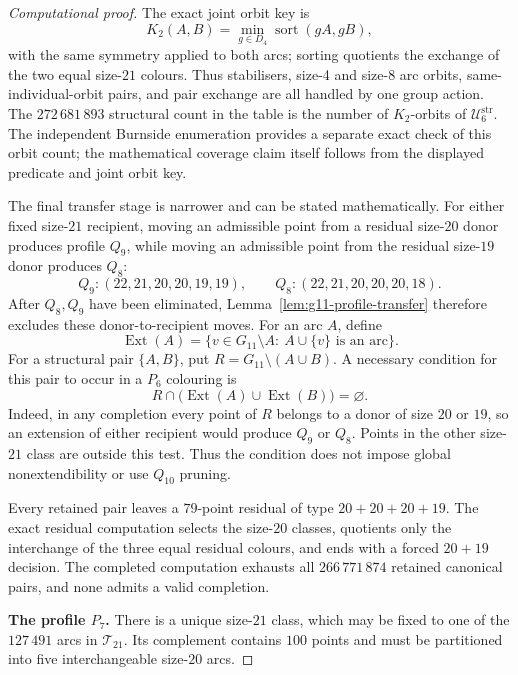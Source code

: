 \documentclass[11pt]{article}
\theoremstyle{definition}
\theoremstyle{remark}
\newcommand{\Dfour}{D_4}
\begin{document}
\begin{proof}[Computational proof]
The exact joint orbit key is
\[
 K_2(A,B)=\min_{g\in\Dfour}\operatorname{sort}(gA,gB),
\]
with the same symmetry applied to both arcs; sorting quotients the exchange of
the two equal size-\(21\) colours.  Thus stabilisers, size-4 and size-8 arc
orbits, same-individual-orbit pairs, and pair exchange are all handled by one
group action.  The \(272\,681\,893\) structural count in the table is the
number of \(K_2\)-orbits of \(\mathcal U^{\mathrm{str}}_6\).  The independent
Burnside enumeration provides a separate exact check of this orbit count; the
mathematical coverage claim itself follows from the displayed predicate and
joint orbit key.

The final transfer stage is narrower and can be stated mathematically.  For
either fixed size-\(21\) recipient, moving an admissible point from a residual
size-\(20\) donor produces profile \(Q_9\), while moving an admissible point
from the residual size-\(19\) donor produces \(Q_8\):
\[
  Q_9:(22,21,20,20,19,19),
  \qquad
  Q_8:(22,21,20,20,20,18).
\]
After \(Q_8,Q_9\) have been eliminated, Lemma~\ref{lem:g11-profile-transfer}
therefore excludes these donor-to-recipient moves.
For an arc \(A\), define
\[
 \operatorname{Ext}(A)=
 \{v\in G_{11}\setminus A:\ A\cup\{v\}\text{ is an arc}\}.
\]
For a structural pair \(\{A,B\}\), put \(R=G_{11}\setminus(A\cup B)\).
A necessary condition for this pair to occur in a \(P_6\) colouring is
\begin{equation}\label{eq:p6-transfer-predicate}
 R\cap\bigl(\operatorname{Ext}(A)\cup\operatorname{Ext}(B)\bigr)
 =\varnothing.
\end{equation}
Indeed, in any completion every point of \(R\) belongs to a donor of size
\(20\) or \(19\), so an extension of either recipient would produce
\(Q_9\) or \(Q_8\).  Points in the other size-\(21\) class are outside
this test.  Thus the condition does not impose global nonextendibility or
use \(Q_{10}\) pruning.

Every retained pair leaves a \(79\)-point residual of type \(20+20+20+19\).
The exact residual computation selects the size-\(20\) classes, quotients only
the interchange of the three equal residual colours, and ends with a forced
\(20+19\) decision.  The completed computation exhausts all
\(266\,771\,874\) retained canonical pairs, and none admits
a valid completion.

\medskip\noindent\textbf{The profile \(P_7\).}\quad
There is a unique size-\(21\) class, which may be fixed to one of the
\(127\,491\) arcs in \(\mathcal T_{21}\).  Its complement
contains \(100\) points and must be partitioned into five interchangeable
size-\(20\) arcs.


\end{proof}
\end{document}
